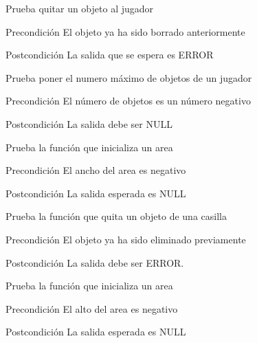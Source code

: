 \begin{DoxyRefList}
\item[\label{test__test000228}%
\hypertarget{test__test000228}{}%
Global \hyperlink{player__test_8c_af06159e33746f5d91723626a565e930c}{test4\-\_\-player\-\_\-remove\-\_\-object} ()]Prueba quitar un objeto al jugador \begin{DoxyPrecond}{Precondición}
El objeto ya ha sido borrado anteriormente 
\end{DoxyPrecond}
\begin{DoxyPostcond}{Postcondición}
La salida que se espera es E\-R\-R\-O\-R  
\end{DoxyPostcond}

\item[\label{test__test000232}%
\hypertarget{test__test000232}{}%
Global \hyperlink{player__test_8c_a630dea620571fd2b05e2cbf403cffabc}{test4\-\_\-player\-\_\-set\-\_\-max\-\_\-objects} ()]Prueba poner el numero máximo de objetos de un jugador \begin{DoxyPrecond}{Precondición}
El número de objetos es un número negativo 
\end{DoxyPrecond}
\begin{DoxyPostcond}{Postcondición}
La salida debe ser N\-U\-L\-L  
\end{DoxyPostcond}

\item[\label{test__test000237}%
\hypertarget{test__test000237}{}%
Global \hyperlink{screen__test_8c_a467e91346197435b187399dc4880ec4f}{test4\-\_\-screen\-\_\-area\-\_\-init} ()]Prueba la función que inicializa un area \begin{DoxyPrecond}{Precondición}
El ancho del area es negativo 
\end{DoxyPrecond}
\begin{DoxyPostcond}{Postcondición}
La salida esperada es N\-U\-L\-L  
\end{DoxyPostcond}

\item[\label{test__test000310}%
\hypertarget{test__test000310}{}%
Global \hyperlink{space__test_8c_ab13db1b36b5af05c202434913df34283}{test4\-\_\-space\-\_\-remove\-\_\-object} ()]Prueba la función que quita un objeto de una casilla \begin{DoxyPrecond}{Precondición}
El objeto ya ha sido eliminado previamente 
\end{DoxyPrecond}
\begin{DoxyPostcond}{Postcondición}
La salida debe ser E\-R\-R\-O\-R.  
\end{DoxyPostcond}

\item[\label{test__test000238}%
\hypertarget{test__test000238}{}%
Global \hyperlink{screen__test_8c_aee7884c2d96f40f91481f14eec776408}{test5\-\_\-screen\-\_\-area\-\_\-init} ()]Prueba la función que inicializa un area \begin{DoxyPrecond}{Precondición}
El alto del area es negativo 
\end{DoxyPrecond}
\begin{DoxyPostcond}{Postcondición}
La salida esperada es N\-U\-L\-L 
\end{DoxyPostcond}

\end{DoxyRefList}
